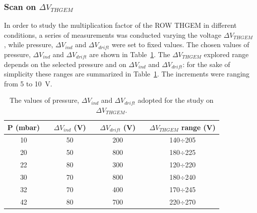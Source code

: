 \documentclass[a4paper, 11 pt]{article}
\newcommand{\Vind}{$\Delta V_{ind}$}
\newcommand{\Vthgem}{$\Delta V_{THGEM}$}
\newcommand{\Vdrift}{$ \Delta V_{drift}$}
\begin{document}


\clearpage

\subsubsection{Scan on \Vthgem}

In order to study the multiplication factor of the ROW THGEM in different conditions, a series of measurements was conducted varying the voltage \Vthgem, while pressure, \Vind{} and \Vdrift{} were set to fixed values.
The chosen values of pressure, \Vind{} and \Vdrift{} are shown in Table~\ref{tab:ROWTHGEM_vthgem}.
The \Vthgem{} explored range depends on the selected pressure and on \Vind{} and \Vdrift: for the sake of simplicity these ranges are summarized in Table~\ref{tab:ROWTHGEM_vthgem}.
The increments were ranging from 5 to 10~V.


\begin{table} [htbp]
	\begin{center}
		\renewcommand{\arraystretch}{1.2}
		\begin{tabular} {ccccccc}
			P (mbar) & & \Vind{} (V) & & \Vdrift{} (V) & & \Vthgem{} range (V)\\
			\toprule[0.1em]
			10	& & 50	& & 200	& & 140$\div$205 \\
			20	& &	50	& &	800 & & 180$\div$225 \\
			22	& & 80	& & 300	& & 120$\div$220 \\
			30	& &	70	& & 800 & & 180$\div$240 \\
			32	& & 70	& &	400	& & 170$\div$245 \\
			42	& & 80	& & 700 & & 220$\div$270 \\

			
			\bottomrule[0.1em]
		\end{tabular}
	\end{center}
	\caption{The values of pressure, \Vind{} and \Vdrift{} adopted for the study on \Vthgem.} \label{tab:ROWTHGEM_vthgem}
\end{table}
\end{document}
